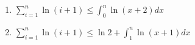 \documentclass[12pt,twoside]{article}
\begin{document}
\begin{problem}{10}
\begin{enumerate}
\item $\displaystyle \sum_{i=1}^n \ln (i+1) \le \int_0^n \ln(x+2)
dx $

\item $\displaystyle \sum_{i=1}^n \ln (i+1) \le \ln 2 + \int_1^n
\ln(x+1) dx $

\end{enumerate}

\eparts

\end{problem}



%
%
%
%
%
%
%
%
%
%
%
%
%
\end{document}
